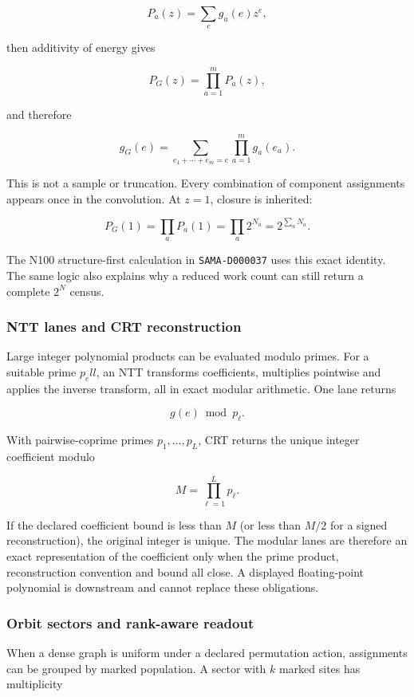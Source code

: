 \[
P_a(z)=\sum_e g_a(e)z^e,
\]

then additivity of energy gives

\[
P_G(z)=\prod_{a=1}^mP_a(z),
\]

and therefore

\[
g_G(e)=\sum_{e_1+\cdots+e_m=e}
        \prod_{a=1}^m g_a(e_a).
\]

This is not a sample or truncation. Every combination of component
assignments appears once in the convolution. At \(z=1\), closure is
inherited:

\[
P_G(1)=\prod_aP_a(1)=\prod_a2^{N_a}=2^{\sum_aN_a}.
\]

The N100 structure-first calculation in \texttt{SAMA-D000037} uses this
exact identity. The same logic also explains why a reduced work count
can still return a complete \(2^N\) census.

\subsubsection{NTT lanes and CRT
reconstruction}\label{viii-ch03-ntt-lanes-and-crt-reconstruction}

Large integer polynomial products can be evaluated modulo primes. For a
suitable prime \(p_ell\), an NTT transforms coefficients, multiplies
pointwise and applies the inverse transform, all in exact modular
arithmetic. One lane returns

\[
g(e)\bmod p_\ell.
\]

With pairwise-coprime primes \(p_1,\ldots,p_L\), CRT returns the unique
integer coefficient modulo

\[
M=\prod_{\ell=1}^Lp_\ell.
\]

If the declared coefficient bound is less than \(M\) (or less than
\(M/2\) for a signed reconstruction), the original integer is unique.
The modular lanes are therefore an exact representation of the
coefficient only when the prime product, reconstruction convention and
bound all close. A displayed floating-point polynomial is downstream and
cannot replace these obligations.

\subsubsection{Orbit sectors and rank-aware
readout}\label{viii-ch03-orbit-sectors-and-rank-aware-readout}

When a dense graph is uniform under a declared permutation action,
assignments can be grouped by marked population. A sector with \(k\)
marked sites has multiplicity

